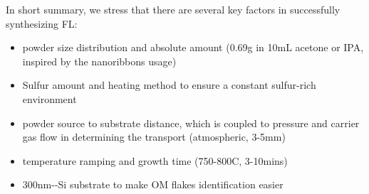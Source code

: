In short summary, we stress that there are several key factors in successfully synthesizing  FL:
\begin{itemize}
\item {} powder size distribution and absolute amount (0.69g  in 10mL acetone or IPA, inspired by the  nanoribbons usage)
\item Sulfur amount and heating method to ensure a constant sulfur-rich environment
\item {} powder source to substrate distance, which is coupled to pressure and carrier gas flow in determining the transport (atmospheric, 3-5mm)
\item temperature ramping and growth time (750-800C, 3-10mins)
\item 300nm--Si substrate to make OM flakes identification easier
\end{itemize}

